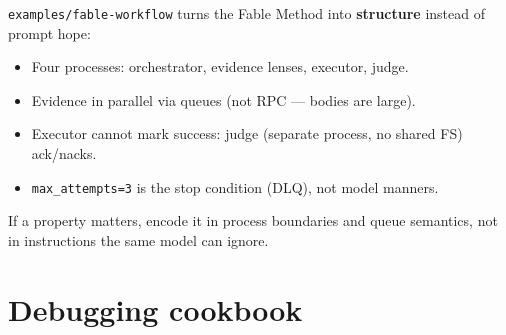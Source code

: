 \documentclass[11pt,a4paper]{article}
\begin{document}
\texttt{examples/fable-workflow} turns the Fable Method into \textbf{structure}
instead of prompt hope:

\begin{itemize}[leftmargin=*]
  \item Four processes: orchestrator, evidence lenses, executor, judge.
  \item Evidence in parallel via queues (not RPC --- bodies are large).
  \item Executor cannot mark success: judge (separate process, no shared FS)
        ack/nacks.
  \item \texttt{max\_attempts=3} is the stop condition (DLQ), not model manners.
\end{itemize}

\begin{keybox}
If a property matters, encode it in process boundaries and queue semantics, not
in instructions the same model can ignore.
\end{keybox}

\section{Debugging cookbook}
\end{document}
